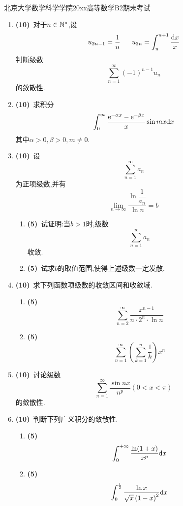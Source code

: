 \documentclass{ctexart}
\begin{document}
\pagestyle{empty}
\begin{center}\Large
    北京大学数学科学学院20xx高等数学B2期末考试
\end{center}
\begin{enumerate}[leftmargin=*,label=\textbf{\arabic*.},topsep=0pt,parsep=0pt,itemsep=0pt,partopsep=0pt]
    \item \textbf{(10)}\ 对于$n\in\mathbb{N}^*$,设
        \[u_{2n-1}=\dfrac1n\ \ \ \ \ u_{2n}=\int_n^{n+1}\dfrac{\di x}{x}\]
        判断级数
        \[\sum_{n=1}^{\infty}(-1)^{n-1}u_n\]
        的敛散性.

    \item \textbf{(10)}\ 求积分
        \[\int_0^{\infty}\dfrac{\mathrm{e}^{-\alpha x}-\mathrm{e}^{-\beta x}}{x}\sin mx\mathrm{d} x\]
        其中$\alpha>0,\beta>0,m\neq0$.

    \item \textbf{(10)}\ 设
        \[\sum_{n=1}^{\infty}a_n\]
        为正项级数,并有
        \[\lim_{n\to\infty}\dfrac{\ln\dfrac{1}{a_n}}{\ln n}=b\]
        \begin{enumerate}[label=\tbf{(\arabic*)},topsep=0pt,parsep=0pt,itemsep=0pt,partopsep=0pt]
            \item \textbf{(5)}\ 试证明:当$b>1$时,级数
                \[\sum_{n=1}^{\infty}a_n\]
                收敛.
            \item \textbf{(5)}\ 试求$b$的取值范围,使得上述级数一定发散.
        \end{enumerate}

    \item \textbf{(10)}\ 求下列函数项级数的收敛区间和收敛域.
        \begin{enumerate}[label=\tbf{(\arabic*)},topsep=0pt,parsep=0pt,itemsep=0pt,partopsep=0pt]
            \item \textbf{(5)}\ 
                \[\sum_{n=2}^{\infty}\dfrac{x^{n-1}}{n\cdot2^n\cdot\ln n}\]
            \item \textbf{(5\songti{分})}\ 
                \[\sum_{n=1}^{\infty}\left(\sum_{k=1}^{n}\dfrac{1}{k}\right)x^n\]

        \end{enumerate}
        
    \item \textbf{(10)}\ 讨论级数
        \[\sum_{n=1}^{\infty}\dfrac{\sin nx}{n^p}(0<x<\pi)\]
        的敛散性.

    \item \textbf{(10)}\ 判断下列广义积分的敛散性.
        \begin{enumerate}[label=\tbf{(\arabic*)},topsep=0pt,parsep=0pt,itemsep=0pt,partopsep=0pt]
            \item \textbf{(5)}
                \[\int_0^{+\infty}\dfrac{\ln(1+x)}{x^p}\mathrm{d} x\]
            \item \textbf{(5\songti{分})}
                \[\int_0^{\frac12}\dfrac{\ln x}{\sqrt{x}\left(1-x\right)^2}\mathrm{d} x\]


\end{enumerate}
\end{enumerate}
\end{document}

